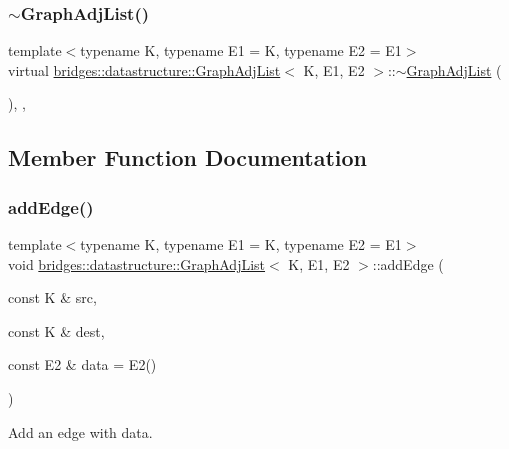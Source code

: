 \subsubsection{\texorpdfstring{$\sim$\+Graph\+Adj\+List()}{~GraphAdjList()}}
{\footnotesize\ttfamily template$<$typename K, typename E1 = K, typename E2 = E1$>$ \\
virtual \hyperlink{classbridges_1_1datastructure_1_1_graph_adj_list}{bridges\+::datastructure\+::\+Graph\+Adj\+List}$<$ K, E1, E2 $>$\+::$\sim$\hyperlink{classbridges_1_1datastructure_1_1_graph_adj_list}{Graph\+Adj\+List} (\begin{DoxyParamCaption}{ }\end{DoxyParamCaption})\hspace{0.3cm}{\ttfamily [inline]}, {\ttfamily [override]}, {\ttfamily [virtual]}}



\subsection{Member Function Documentation}
\mbox{\label{classbridges_1_1datastructure_1_1_graph_adj_list_a6573cc104657315196404bcef481d890}} 
\subsubsection{\texorpdfstring{add\+Edge()}{addEdge()}}
{\footnotesize\ttfamily template$<$typename K, typename E1 = K, typename E2 = E1$>$ \\
void \hyperlink{classbridges_1_1datastructure_1_1_graph_adj_list}{bridges\+::datastructure\+::\+Graph\+Adj\+List}$<$ K, E1, E2 $>$\+::add\+Edge (\begin{DoxyParamCaption}\item[{const K \&}]{src,  }\item[{const K \&}]{dest,  }\item[{const E2 \&}]{data = {\ttfamily E2()} }\end{DoxyParamCaption})\hspace{0.3cm}{\ttfamily [inline]}}



Add an edge with data. 

